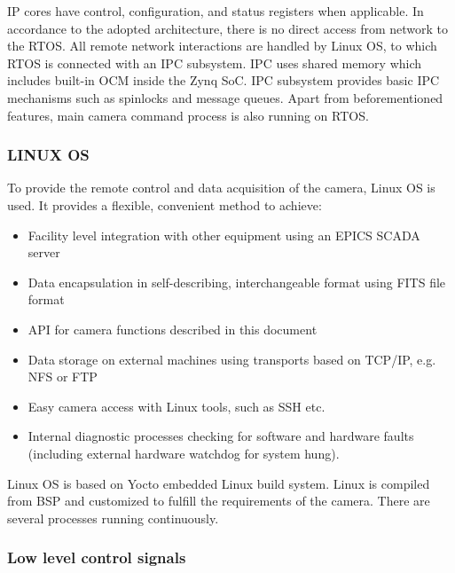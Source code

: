 IP cores have control, configuration, and status registers when applicable. In accordance to the adopted architecture, there is no direct access from network to the RTOS. All remote network interactions are handled by Linux OS, to which RTOS is connected with an IPC subsystem. IPC uses shared memory which includes built-in OCM inside the Zynq SoC. IPC subsystem provides basic IPC mechanisms such as spinlocks and message queues. Apart from beforementioned features, main camera command process is also running on RTOS. 

\subsubsection{LINUX OS}
To provide the remote control and data acquisition of the camera, Linux OS is used. It provides a flexible, convenient method to achieve:
\begin{itemize}
\item Facility level integration with other equipment using an EPICS SCADA server
\item Data encapsulation in self-describing, interchangeable format using FITS file format
\item API for camera functions described in this document
\item Data storage on external machines using transports based on TCP/IP, e.g. NFS or FTP
\item Easy camera access with Linux tools, such as SSH etc.
\item Internal diagnostic processes checking for software and hardware faults (including external hardware watchdog for system hung).
\end{itemize}

Linux OS is based on Yocto embedded Linux build system. Linux is compiled from BSP and customized to fulfill the requirements of the camera. There are several processes running continuously.

\subsubsection{Low level control signals}



